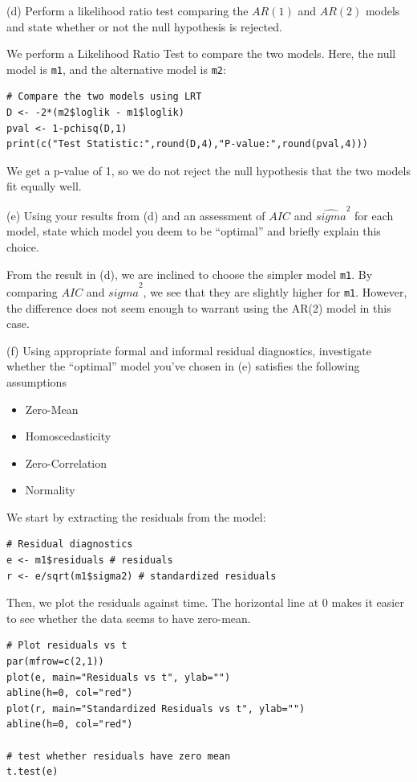 \documentclass[]{article}
\begin{document}
(d) Perform a likelihood ratio test comparing the $AR(1)$ and $AR(2)$ models and state
whether or not the null hypothesis is rejected.

\color{blue}
We perform a Likelihood Ratio Test to compare the two models. Here, the null model is \texttt{m1}, and the alternative model is \texttt{m2}:

\begin{Verbatim}[frame=single]
# Compare the two models using LRT
D <- -2*(m2$loglik - m1$loglik)
pval <- 1-pchisq(D,1)
print(c("Test Statistic:",round(D,4),"P-value:",round(pval,4)))
\end{Verbatim}

We get a p-value of 1, so we do not reject the null hypothesis that the two models fit equally well.
\color{black}

(e) Using your results from (d) and an assessment of $AIC$ and $\hat{sigma}^2$ for each model, state which model you deem to be “optimal” and briefly explain this choice.

\color{blue}
From the result in (d), we are inclined to choose the simpler model \texttt{m1}. By comparing $AIC$ and $\hat{sigma}^2$, we see that they are slightly higher for \texttt{m1}. However, the difference does not seem enough to warrant using the AR(2) model in this case.
\color{black}

(f) Using appropriate formal and informal residual diagnostics, investigate whether the “optimal” model you’ve chosen in (e) satisfies the following assumptions
\begin{itemize}
  \item Zero-Mean
  \item Homoscedasticity
  \item Zero-Correlation
  \item Normality
\end{itemize}

\color{blue}
We start by extracting the residuals from the model:

\begin{Verbatim}[frame=single]
# Residual diagnostics
e <- m1$residuals # residuals
r <- e/sqrt(m1$sigma2) # standardized residuals
\end{Verbatim}

Then, we plot the residuals against time. The horizontal line at 0 makes it easier to see whether the data seems to have zero-mean.
\begin{Verbatim}[frame=single]
# Plot residuals vs t
par(mfrow=c(2,1))
plot(e, main="Residuals vs t", ylab="")
abline(h=0, col="red")
plot(r, main="Standardized Residuals vs t", ylab="")
abline(h=0, col="red")

# test whether residuals have zero mean
t.test(e)
\end{Verbatim}
\end{document}
